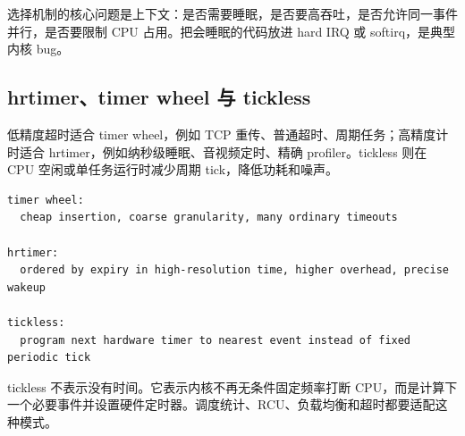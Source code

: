 选择机制的核心问题是上下文：是否需要睡眠，是否要高吞吐，是否允许同一事件并行，是否要限制 CPU 占用。把会睡眠的代码放进 hard IRQ 或 softirq，是典型内核 bug。

\subsection{hrtimer、timer wheel 与 tickless}

低精度超时适合 timer wheel，例如 TCP 重传、普通超时、周期任务；高精度计时适合 hrtimer，例如纳秒级睡眠、音视频定时、精确 profiler。tickless 则在 CPU 空闲或单任务运行时减少周期 tick，降低功耗和噪声。

\begin{lstlisting}
timer wheel:
  cheap insertion, coarse granularity, many ordinary timeouts

hrtimer:
  ordered by expiry in high-resolution time, higher overhead, precise wakeup

tickless:
  program next hardware timer to nearest event instead of fixed periodic tick
\end{lstlisting}

tickless 不表示没有时间。它表示内核不再无条件固定频率打断 CPU，而是计算下一个必要事件并设置硬件定时器。调度统计、RCU、负载均衡和超时都要适配这种模式。

